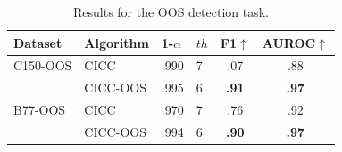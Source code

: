 \begin{table}[tp]
\centering
\setlength\tabcolsep{2pt}
\begin{tabular}{llll|cc}
\toprule
Dataset         &  Algorithm    & 1-$\alpha$ & $th$ & F1$\uparrow$    & AUROC$\uparrow$ \\
\midrule
C150-OOS        &   CICC        & .990      & 7     & .07   & .88 \\
                &   CICC-OOS    & .995      & 6     & \textbf{.91}   & \textbf{.97} \\ \midrule
B77-OOS         &   CICC        & .970      & 7     & .76   & .92 \\
                &   CICC-OOS    & .994      & 6     & \textbf{.90}   & \textbf{.97} \\
\bottomrule
\end{tabular}
    \caption{Results for the OOS detection task.}
    \label{tab:ood_results}
\end{table}